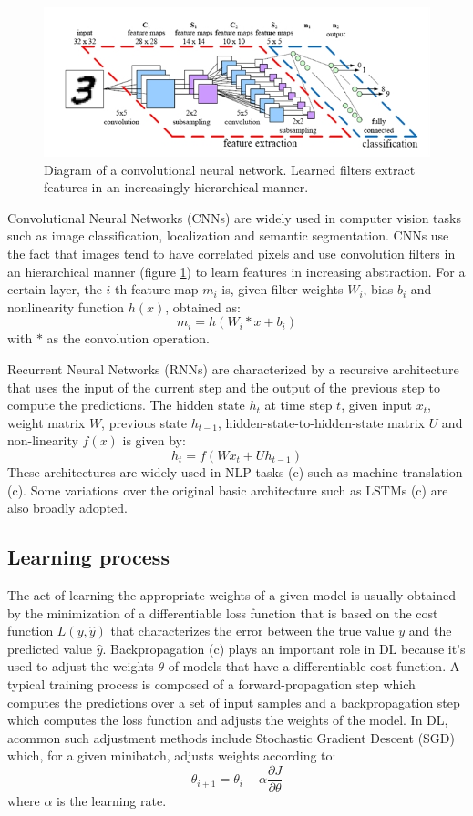 \documentclass[English]{style/ic-tese-v3}
\begin{document}
\begin{figure}
\begin{center}
    \includegraphics[width=1.0\linewidth]{./img/cnn.png}
\caption{
    Diagram of a convolutional neural network.
    Learned filters extract features in an increasingly hierarchical manner.
}
\label{fig:cnn}
\end{center}
\end{figure}

Convolutional Neural Networks (CNNs) are widely used
in computer vision
tasks such as image classification, localization and semantic segmentation.
CNNs use the fact that images tend to have correlated pixels and use
convolution filters in an hierarchical manner (figure \ref{fig:cnn})
to learn features in increasing abstraction.
For a certain layer, the $i$-th feature map $m_i$ is,
given filter weights $W_i$, bias $b_i$ and nonlinearity function $h(x)$,
obtained as:
$$m_i = h\left(W_i * x + b_i\right)$$
with $*$ as the convolution operation.

Recurrent Neural Networks (RNNs) are characterized by a recursive architecture
that uses the input of the current step and the output of the previous
step to compute the predictions.
The hidden state $h_t$ at time step $t$, given input $x_t$, weight matrix $W$,
previous state $h_{t-1}$, hidden-state-to-hidden-state matrix $U$ and
non-linearity $f(x)$ is given by:
$$h_t = f\left(Wx_t + Uh_{t-1}\right)$$
These architectures are widely used in NLP tasks (c) such as
machine translation (c).
Some variations over the original basic architecture such as
LSTMs (c) are also broadly adopted.

\subsection{Learning process}
The act of learning the appropriate weights of a given model
is usually obtained by the minimization of a differentiable loss function
that is based on the cost function $L(y, \hat{y})$ that characterizes the error
between the true value $y$ and the predicted value $\hat{y}$.
Backpropagation (c) plays an important role in DL because it's used
to adjust the weights $\theta$ of models that have a
differentiable cost function.
A typical training process is composed of a forward-propagation
step which computes the predictions over a set of input samples
and a backpropagation step which computes the loss function
and adjusts the weights of the model.
In DL, acommon such adjustment methods include Stochastic Gradient Descent (SGD)
which, for a given minibatch, adjusts weights according to:
$$\theta_{i+1} = \theta_i - \alpha\frac{\partial{J}}{\partial{\theta}}$$
where $\alpha$ is the learning rate.
\end{document}
